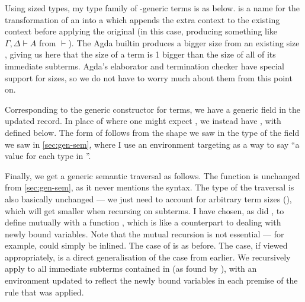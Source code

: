 Using sized types, my type family of -generic terms is as
below.
 is a name for the transformation of an
 into a \AgdaSpace{}\AgdaSymbol{$\to$}%
\AgdaSpace{} which appends the extra context to the
existing context before applying the original 
(in this case, producing something like $\Gamma, \Delta \vdash A$ from
$\vdash$).
The Agda builtin \AgdaPostulate{$\uparrow$} produces a bigger size from an
existing size , giving us here that the size of a term is 1 bigger
than the size of all of its immediate subterms.
Agda's elaborator and termination checker have special support for sizes, so we
do not have to worry much about them from this point on.


Corresponding to the generic  constructor for
terms, we have a generic field  in the
updated  record.
In place of where one might expect
\AgdaSpace{}\AgdaBound{$\C$}, we instead have
\AgdaSpace{}\AgdaBound{$\V$}\AgdaSpace{}\AgdaBound{$\C$},
with  defined below.
The form of  follows from the shape we saw in the type of
the  field we saw in \cref{sec:gen-sem},
where I use an environment targeting \AgdaBound{$\Delta$} as a way to say
``a value for each type in \AgdaBound{$\Delta$}''.


Finally, we get a generic semantic traversal as follows.
The function  is unchanged from \cref{sec:gen-sem}, as it
never mentions the syntax.
The type of the traversal  is also basically unchanged --- we
just need to account for arbitrary term sizes (), which will get
smaller when recursing on subterms.
I have chosen, as did \citet{AACMM21}, to define  mutually
with a function , which is like a counterpart to
 dealing with newly bound variables.
Note that the mutual recursion is not essential --- for example,
 could simply be inlined.
The  case of  is as before.
The  case, if viewed appropriately, is a direct
generalisation of the  case from earlier.
We recursively apply  to all immediate subterms contained in
 (as found by ), with an environment updated to
reflect the newly bound variables in each premise of the rule that was applied.

